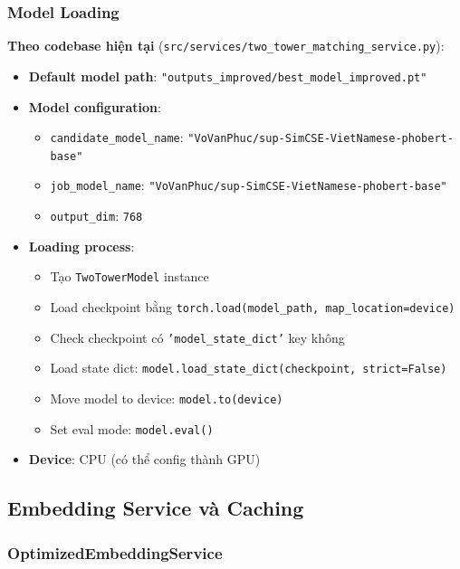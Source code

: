 \subsubsection{Model Loading}

\textbf{Theo codebase hiện tại} (\texttt{src/services/two\_tower\_matching\_service.py}):

\begin{itemize}
    \item \textbf{Default model path}: \texttt{"outputs\_improved/best\_model\_improved.pt"}
    \item \textbf{Model configuration}:
    \begin{itemize}
        \item \texttt{candidate\_model\_name}: \texttt{"VoVanPhuc/sup-SimCSE-VietNamese-phobert-base"}
        \item \texttt{job\_model\_name}: \texttt{"VoVanPhuc/sup-SimCSE-VietNamese-phobert-base"}
        \item \texttt{output\_dim}: \texttt{768}
    \end{itemize}
    \item \textbf{Loading process}:
    \begin{itemize}
        \item Tạo \texttt{TwoTowerModel} instance
        \item Load checkpoint bằng \texttt{torch.load(model\_path, map\_location=device)}
        \item Check checkpoint có \texttt{'model\_state\_dict'} key không
        \item Load state dict: \texttt{model.load\_state\_dict(checkpoint, strict=False)}
        \item Move model to device: \texttt{model.to(device)}
        \item Set eval mode: \texttt{model.eval()}
    \end{itemize}
    \item \textbf{Device}: CPU (có thể config thành GPU)
\end{itemize}

\subsection{Embedding Service và Caching}

\subsubsection{OptimizedEmbeddingService}

